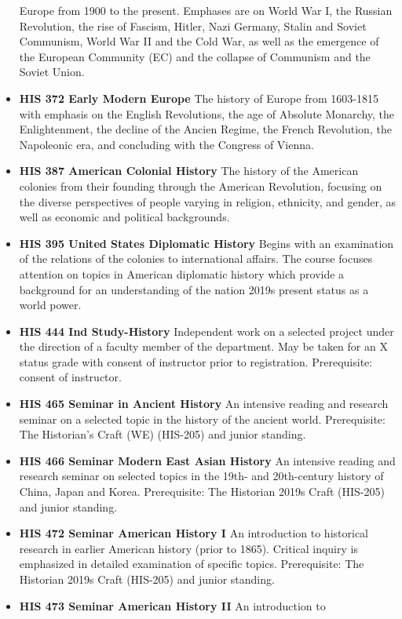 \documentclass[
  letterpaper,
]{scrbook}
\begin{document}
\begin{itemize}
  Europe from 1900 to the present. Emphases are on World War I, the
  Russian Revolution, the rise of Fascism, Hitler, Nazi Germany, Stalin
  and Soviet Communism, World War II and the Cold War, as well as the
  emergence of the European Community (EC) and the collapse of Communism
  and the Soviet Union.
\item
  \textbf{HIS 372 Early Modern Europe} The history of Europe from
  1603-1815 with emphasis on the English Revolutions, the age of
  Absolute Monarchy, the Enlightenment, the decline of the Ancien
  Regime, the French Revolution, the Napoleonic era, and concluding with
  the Congress of Vienna.
\item
  \textbf{HIS 387 American Colonial History} The history of the American
  colonies from their founding through the American Revolution, focusing
  on the diverse perspectives of people varying in religion, ethnicity,
  and gender, as well as economic and political backgrounds.
\item
  \textbf{HIS 395 United States Diplomatic History} Begins with an
  examination of the relations of the colonies to international affairs.
  The course focuses attention on topics in American diplomatic history
  which provide a background for an understanding of the nation 2019s
  present status as a world power.
\item
  \textbf{HIS 444 Ind Study-History} Independent work on a selected
  project under the direction of a faculty member of the department. May
  be taken for an X status grade with consent of instructor prior to
  registration. Prerequisite: consent of instructor.
\item
  \textbf{HIS 465 Seminar in Ancient History} An intensive reading and
  research seminar on a selected topic in the history of the ancient
  world. Prerequisite: The Historian's Craft (WE) (HIS-205) and junior
  standing.
\item
  \textbf{HIS 466 Seminar Modern East Asian History} An intensive
  reading and research seminar on selected topics in the 19th- and
  20th-century history of China, Japan and Korea. Prerequisite: The
  Historian 2019s Craft (HIS-205) and junior standing.
\item
  \textbf{HIS 472 Seminar American History I} An introduction to
  historical research in earlier American history (prior to 1865).
  Critical inquiry is emphasized in detailed examination of specific
  topics. Prerequisite: The Historian 2019s Craft (HIS-205) and junior
  standing.
\item
  \textbf{HIS 473 Seminar American History II} An introduction to

\end{itemize}
\end{document}
